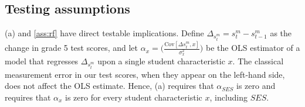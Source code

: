 \subsection{Testing assumptions}

(a) and \ref{ass:rf} have direct testable implications. Define $\Delta_{s^m_{t}}=s_{t}^m-s_{t-1}^m$ as the change in grade 5 test scores, and let $\alpha_x = \big(\frac{\mathrm{Cov}[\Delta {s^m_{t}},x]}{\sigma_{x}^2}\big)$ be the OLS estimator of a model that regresses $\Delta_{s^m_{t}}$ upon a single student characteristic $x$. The classical measurement error in our test scores, when they appear on the left-hand side, does not affect the OLS estimate. Hence, (a) requires that $\alpha_{SES}$ is zero and  requires that $\alpha_{x}$ is zero for every student characteristic $x$, including $SES$.

